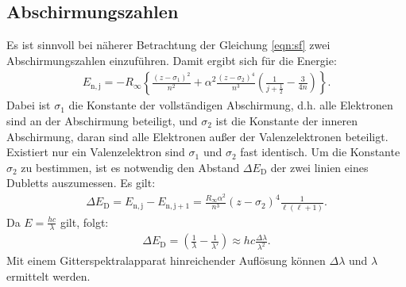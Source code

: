 \subsection{Abschirmungszahlen}
Es ist sinnvoll bei näherer Betrachtung der Gleichung \eqref{eqn:sf} zwei Abschirmungszahlen einzuführen.
Damit ergibt sich für die Energie:
\begin{align}
  E_\mathrm{n,j}=-R_\mathrm{\infty}\left\{\frac{(z-\sigma_\mathrm{1})^2}{n^2}+\alpha^2\frac{(z-\sigma_\mathrm{2})^4}{n^3}\left(\frac{1}{j+\frac{1}{2}}-\frac{3}{4n}\right)\right\}.
\end{align}
Dabei ist $\sigma_\mathrm{1}$ die Konstante der vollständigen Abschirmung, d.h. alle Elektronen sind an der Abschirmung beteiligt,
und $\sigma_\mathrm{2}$ ist die Konstante der inneren Abschirmung, daran sind alle Elektronen außer der Valenzelektronen beteiligt.
Existiert nur ein Valenzelektron sind $\sigma_\mathrm{1}$ und $\sigma_\mathrm{2}$ fast identisch.
Um die Konstante $\sigma_\mathrm{2}$ zu bestimmen, ist es notwendig den Abstand $\Delta E_\mathrm{D}$ der zwei linien eines Dubletts auszumessen.
Es gilt:
\begin{align}
  \Delta E_\mathrm{D} = E_\mathrm{n,j}-E_\mathrm{n,j+1}=\frac{R_\mathrm{\infty}\alpha^2}{n^3}(z-\sigma_\mathrm{2})^4\frac{1}{\ell(\ell+1)}. \label{eqn:popo}
\end{align}
Da $E=\frac{hc}{\lambda}$ gilt, folgt:
\begin{align}
\Delta E_\mathrm{D}=\left(\frac{1}{\lambda}-\frac{1}{\lambda'}\right) \approx hc\frac{\Delta\lambda}{\lambda^2}.\label{eqn:E}
\end{align}
Mit einem Gitterspektralapparat hinreichender Auflösung können $\Delta\lambda$ und $\lambda$ ermittelt werden.

